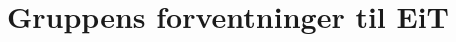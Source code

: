 \section{Gruppens forventninger til EiT}


\vspace{\secspace}


\vspace{\secspace}


\vspace{\secspace}


\vspace{\secspace}


\vspace{\secspace}
